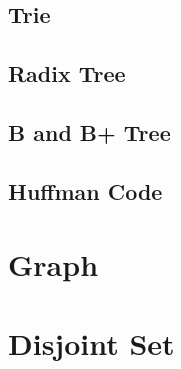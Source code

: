 \subsection{Trie}

\subsection{Radix Tree}

\subsection{B and B+ Tree}

\subsection{Huffman Code}

\section{Graph}

\section{Disjoint Set}
